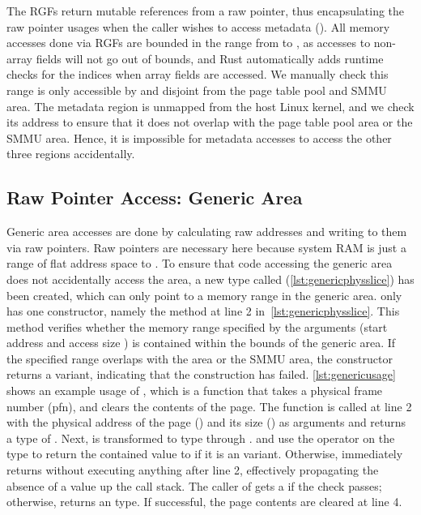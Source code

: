 The RGFs return mutable references from a raw pointer, thus encapsulating the
raw pointer usages when the caller wishes to access \rustcore{} metadata
().
All memory accesses done via RGFs are bounded in the range
from  to
,
as accesses to non-array fields will not go out of bounds,
and Rust automatically adds runtime checks for the indices when array fields are accessed.
We manually check this range is only accessible by \rustcore{} and disjoint
from the page table pool and SMMU area. The \rustcore{} metadata region is
unmapped from the host Linux kernel, and we check its address to ensure that it
does not overlap with the page table pool area or the SMMU area.
Hence, it is impossible for \rustcore{} metadata accesses to access
the other three regions accidentally.

\subsection{Raw Pointer Access: Generic Area}
Generic area accesses are done by calculating raw addresses and writing to them
via raw pointers. Raw pointers are necessary here because system RAM is just a
range of flat address space to \rustcore{}. To ensure that code accessing the
generic area does not accidentally access the \rustcore{} area,
a new type called 
(\autoref{lst:genericphysslice}) has been created, which can only point to a
memory range in the generic area.
 only has one constructor, namely the 
method at line 2 in~\autoref{lst:genericphysslice}. This method verifies whether
the memory range specified by the arguments (start address  and
access size ) is contained within the bounds of the generic area.
If the specified range overlaps with the \rustcore{} area or the SMMU area, the constructor
returns a  variant, indicating that the construction has failed.
\autoref{lst:genericusage} shows an example usage of
, which is a function that takes a physical frame number
(pfn), and clears the contents of the page.
The  function is called at line 2 with the
physical address of the page () and its size
() as arguments and returns a type of
.
Next,  is transformed to  type through .
and use the  operator on the  type to return the
contained value to  if it is an  variant.
Otherwise,  immediately returns 
without executing anything after line 2,
effectively propagating the absence of a value up the call stack.
The caller of  gets a
 if the check passes; otherwise,
 returns an  type.
If successful, the page contents are cleared at line 4.

